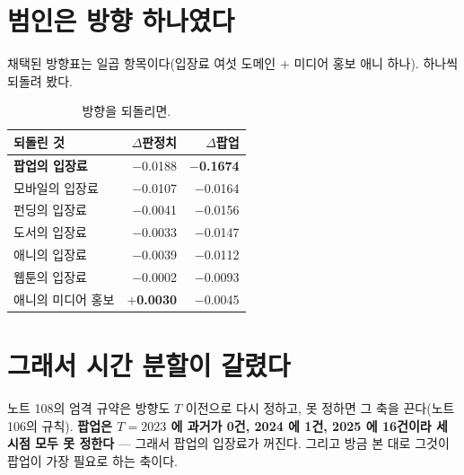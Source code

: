 \documentclass[10pt]{article}
\begin{document}

\section{범인은 방향 하나였다}

채택된 방향표는 일곱 항목이다(입장료 여섯 도메인 $+$ 미디어 홍보 애니 하나).
하나씩 되돌려 봤다.

\begin{table}[t]
\centering\tsize
\caption{방향을 되돌리면.}
\begin{tabular}{lrr}
\toprule
되돌린 것 & $\Delta$판정치 & $\Delta$팝업 \\
\midrule
\textbf{팝업의 입장료} & $-$0.0188 & \textbf{$-$0.1674} \\
\midrule
모바일의 입장료 & $-$0.0107 & $-$0.0164 \\
펀딩의 입장료 & $-$0.0041 & $-$0.0156 \\
도서의 입장료 & $-$0.0033 & $-$0.0147 \\
애니의 입장료 & $-$0.0039 & $-$0.0112 \\
웹툰의 입장료 & $-$0.0002 & $-$0.0093 \\
애니의 미디어 홍보 & \textbf{$+$0.0030} & $-$0.0045 \\
\bottomrule
\end{tabular}
\end{table}


\section{그래서 시간 분할이 갈렸다}

노트 108의 엄격 규약은 방향도 $T$ 이전으로 다시 정하고, 못 정하면 그 축을
끈다(노트 106의 규칙). \textbf{팝업은 $T{=}2023$ 에 과거가 0건, 2024 에
1건, 2025 에 16건이라 세 시점 모두 못 정한다} --- 그래서 팝업의 입장료가
꺼진다. 그리고 방금 본 대로 그것이 팝업이 가장 필요로 하는 축이다.
\end{document}
